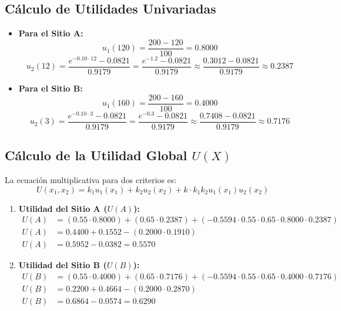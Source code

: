 \documentclass[11pt, letterpaper]{article}
\begin{document}
\subsection{Cálculo de Utilidades Univariadas}
\begin{itemize}
    \item \textbf{Para el Sitio A:}
    \begin{equation}
        u_1(120) = \frac{200 - 120}{100} = 0.8000
    \end{equation}
    \begin{equation}
        u_2(12) = \frac{e^{-0.10 \cdot 12} - 0.0821}{0.9179} = \frac{e^{-1.2} - 0.0821}{0.9179} \approx \frac{0.3012 - 0.0821}{0.9179} \approx 0.2387
    \end{equation}

    \item \textbf{Para el Sitio B:}
    \begin{equation}
        u_1(160) = \frac{200 - 160}{100} = 0.4000
    \end{equation}
    \begin{equation}
        u_2(3) = \frac{e^{-0.10 \cdot 3} - 0.0821}{0.9179} = \frac{e^{-0.3} - 0.0821}{0.9179} \approx \frac{0.7408 - 0.0821}{0.9179} \approx 0.7176
    \end{equation}
\end{itemize}

\subsection{Cálculo de la Utilidad Global $U(X)$}
La ecuación multiplicativa para dos criterios es:
\begin{equation}
    U(x_1, x_2) = k_1 u_1(x_1) + k_2 u_2(x_2) + k \cdot k_1 k_2 u_1(x_1) u_2(x_2)
\end{equation}

\begin{enumerate}
    \item \textbf{Utilidad del Sitio A ($U(A)$):}
    \begin{align}
        U(A) &= (0.55 \cdot 0.8000) + (0.65 \cdot 0.2387) + (-0.5594 \cdot 0.55 \cdot 0.65 \cdot 0.8000 \cdot 0.2387) \nonumber \\
        U(A) &= 0.4400 + 0.1552 - (0.2000 \cdot 0.1910) \nonumber \\
        U(A) &= 0.5952 - 0.0382 = \mathbf{0.5570}
    \end{align}

    \item \textbf{Utilidad del Sitio B ($U(B)$):}
    \begin{align}
        U(B) &= (0.55 \cdot 0.4000) + (0.65 \cdot 0.7176) + (-0.5594 \cdot 0.55 \cdot 0.65 \cdot 0.4000 \cdot 0.7176) \nonumber \\
        U(B) &= 0.2200 + 0.4664 - (0.2000 \cdot 0.2870) \nonumber \\
        U(B) &= 0.6864 - 0.0574 = \mathbf{0.6290}
    \end{align}
\end{enumerate}
\end{document}
